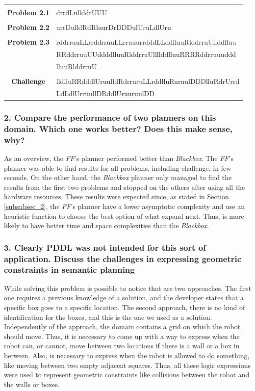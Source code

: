 \documentclass[10pt, letter]{article}
\begin{document}
\begin{tabular}{ c l }
  &\\
  \textbf{Problem 2.1} & drrdLullddrUUU\\
  &\\
  \textbf{Problem 2.2} & urrDulldRdRluurDrDDDulUruLdlUru\\
  &\\
  \textbf{Problem 2.3} & rddrruuLLrrddrruuLLrruuurrdddLLddlluuRlddrruUllddlluu\\
                       & RRddrruuUUddddlluuRlddrruUllllddlluuRRRRddrruuuddd\\
                       & lluuRlddrruU\\
  &\\
  \textbf{Challenge}   & lldlluRRdddlUruulldRdrruruLLrddlluRuruulDDDlluRdrUrrd\\
                       & LdLdlUrruullDRddlUruuruulDD\\
\end{tabular}

\subsubsection*{2. Compare the performance of two planners on this domain. Which one works better? Does this
make sense, why?}

As an overview, the \textit{FF}'s planner performed better than \textit{Blackbox}. The \textit{FF}'s planner was able to find results for all problems, including challenge, in few seconds. On the other hand, the \textit{Blackbox} planner only managed to find the results from the first two problems and stopped on the others after using all the hardware resources. These results were expected since, as stated in Section \ref{subsubsec_2}, the \textit{FF}'s planner have a lower asymptotic complexity and use an heuristic function to choose the best option of what expand next. Thus, is more likely to have better time and space complexities than the \textit{Blackbox}.

\subsubsection*{3. Clearly PDDL was not intended for this sort of application. Discuss the challenges in expressing geometric constraints in semantic planning}

While solving this problem is possible to notice that are two approaches. The first one requires a previous knowledge of a solution, and the developer states that a specific box goes to a specific location. The second approach, there is no kind of identification for the boxes, and this is the one we used as a solution. Independently of the approach, the domain contains a grid on which the robot should move. Thus, it is necessary to come up with a way to express when the robot can, or cannot, move between two locations if there is a wall or a box in between. Also, is necessary to express when the robot is allowed to do something, like moving between two empty adjacent squares. Thus, all these logic expressions were used to represent geometric constraints like collisions between the robot and the walls or boxes.
\end{document}
